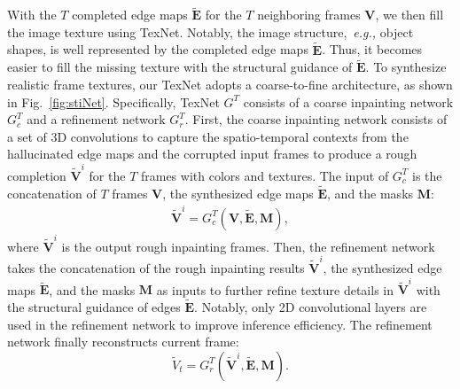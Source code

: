  
With the $T$ completed edge maps $\boldsymbol{\widetilde{E}}$ for the $T$ neighboring frames $\boldsymbol{V}$, we then fill the image texture using TexNet.
Notably, the image structure,~\emph{e.g.,} object shapes, is well represented by the completed edge maps $\boldsymbol{\widetilde{E}}$.
Thus, it becomes easier to fill the missing texture with the structural guidance of $\boldsymbol{\widetilde{E}}$.
%
To synthesize realistic frame textures, our TexNet adopts a coarse-to-fine architecture, as shown in Fig.~\ref{fig:stiNet}.
Specifically, TexNet {\color{blue}$G^T$} consists of a coarse inpainting network {\color{blue}$G_c^T$} and a refinement network {\color{blue}$G_r^T$}.
%
First, the coarse inpainting network consists of a set of 3D convolutions to capture the spatio-temporal contexts from the hallucinated edge maps and the corrupted input frames to produce a rough completion $\boldsymbol{\widetilde{V}}^i$ for the $T$ frames with colors and textures. {\color{blue}The input of $G^T_c$ is the concatenation of $T$ frames $\boldsymbol{V}$, the synthesized edge maps $\boldsymbol{\widetilde{E}}$, and the masks $\boldsymbol{M}$:}
	\begin{equation}
	\begin{aligned}
	\label{eq:coarsenet}
	\boldsymbol{\widetilde{V}}^i=G_{c}^T(\boldsymbol{V},\boldsymbol{\widetilde{E}},\boldsymbol{M}),
	\end{aligned}
	\end{equation}
where $\boldsymbol{\widetilde{V}}^i$ is the output rough inpainting frames.
Then, the refinement network takes {\color{blue}the concatenation of} the rough inpainting results $\boldsymbol{\widetilde{V}}^i$, the synthesized edge maps $\boldsymbol{\widetilde{E}}$, and the masks $\boldsymbol{M}$ as inputs to further refine texture details in $\boldsymbol{\widetilde{V}}^i$ with the structural guidance of edges $\boldsymbol{\widetilde{E}}$. 
Notably, only 2D convolutional layers are used in the refinement network to improve inference efficiency. 
{\color{blue}
	The refinement network finally reconstructs current frame:
	\begin{equation}
	\label{eq:refinenet}
	\widetilde{V}_t=G_{r}^T(\boldsymbol{\widetilde{V}}^i,\boldsymbol{\widetilde{E}},\boldsymbol{M}).	
	\end{equation}
}
